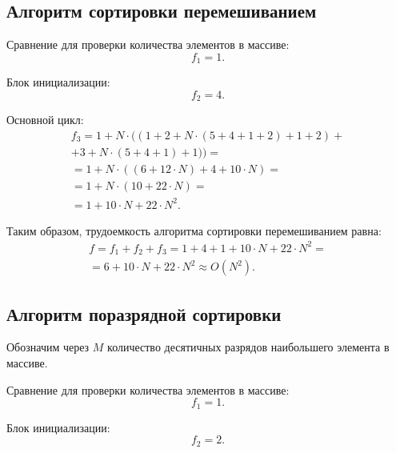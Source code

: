 \subsection{Алгоритм сортировки перемешиванием}
\label{sub:cocktail_sort}

Сравнение для проверки количества элементов в массиве:
\begin{equation}
f_1 = 1.
\end{equation}

Блок инициализации:
\begin{equation}
f_2 = 4.
\end{equation}

Основной цикл:
\begin{equation}
\begin{gathered}
f_3 = 1 + N \cdot ((1 + 2 + N \cdot (5 + 4 + 1 + 2) + 1 + 2) + \\ + 3 + N \cdot (5 + 4 + 1) + 1)) = \\ = 1 + N \cdot ((6 + 12 \cdot N) + 4 + 10 \cdot N) = \\ = 1 + N \cdot (10 + 22 \cdot N) = \\ = 1 + 10 \cdot N + 22 \cdot N^2.
\end{gathered}
\end{equation}

Таким образом, трудоемкость алгоритма сортировки перемешиванием равна:
\begin{equation}
\begin{gathered}
f = f_1 + f_2 + f_3 = 1 + 4 + 1 + 10 \cdot N + 22 \cdot N^2 = \\ = 6 + 10 \cdot N + 22 \cdot N^2 \approx O(N^2).
\end{gathered}
\end{equation}

\subsection{Алгоритм поразрядной сортировки}

Обозначим через $M$ количество десятичных разрядов наибольшего элемента в массиве.

Сравнение для проверки количества элементов в массиве:
\begin{equation}
f_1 = 1.
\end{equation}

Блок инициализации:
\begin{equation}
f_2 = 2.
\end{equation}


